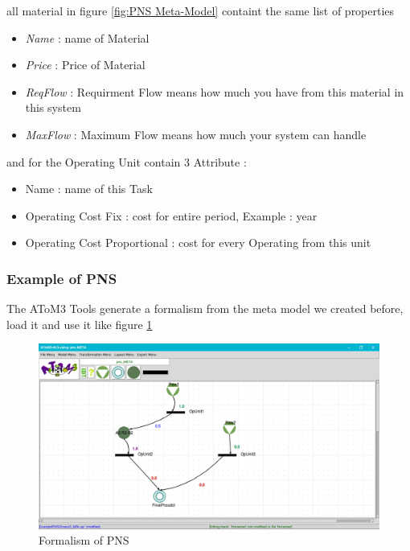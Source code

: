 all material in figure \ref{fig:PNS Meta-Model} containt the same list of properties
\begin{itemize}

\newcommand{\localtextbulletone}{\textcolor{gray}{\raisebox{.45ex}{\rule{.6ex}{.6ex}}}}
\renewcommand{\labelitemi}{\localtextbulletone}

\item \textit{Name} : name of Material 
\item \textit{Price} : Price of Material
\item \textit{ReqFlow} : Requirment Flow means how much you have from this material in this system
\item \textit{MaxFlow} : Maximum Flow means how much your system can handle

\end{itemize}



and for the Operating Unit contain 3 Attribute : 
\begin{itemize}
\newcommand{\localtextbulletone}{\textcolor{gray}{\raisebox{.45ex}{\rule{.6ex}{.6ex}}}}
\renewcommand{\labelitemi}{\localtextbulletone}
\item Name : name of this Task 
\item Operating Cost Fix : cost for entire period, Example : year
\item Operating Cost Proportional : cost for every Operating from this unit

\end{itemize}


\subsubsection{Example of PNS}
The AToM3 Tools generate a formalism from the meta model we created before, load it and use it like figure \ref{fig:PNS Model} 

\begin{figure}[th]
	\centering
 	\includegraphics[scale=0.3]{ch3/img/pns_model}
	\caption{\label{fig:PNS Model}Formalism of PNS}
\end{figure} 


